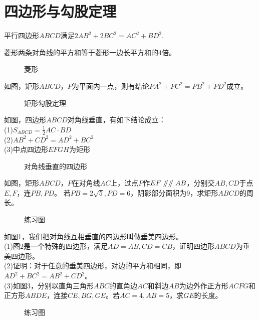 \section{四边形与勾股定理}
\begin{theorem}
    平行四边形$ABCD$满足$2AB^2+2BC^2=AC^2+BD^2$.
\end{theorem}
\begin{corollary}
    菱形两条对角线的平方和等于菱形一边长平方和的4倍。
\end{corollary}
\begin{figure}[H]
    \centering
    \resizebox{4cm}{!}{}
    \caption{菱形}
\end{figure}
\begin{definition}
    如图，矩形$ABCD$，$P$为平面内一点，则有结论$PA^2+PC^2=PB^2+PD^2$成立。
\end{definition}
\begin{figure}[H]
    \centering
    \resizebox{8cm}{!}{}
    \caption{矩形勾股定理}
\end{figure}
\begin{definition}
    如图，四边形$ABCD$对角线垂直，有如下结论成立： \\
    (1)$S_{ABCD}=\frac{1}{2}AC·BD$ \\
    (2)$AB^2+CD^2=AD^2+BC^2$ \\
    (3)中点四边形$EFGH$为矩形
\end{definition}
\begin{figure}[H]
    \centering
    \resizebox{4cm}{!}{}
    \caption{对角线垂直的四边形}
\end{figure}
\begin{problem}
如图，矩形$ABCD$，$P$在对角线$AC$上，过点$P$作$EF\mathrel{/\mkern-5mu/}\mathrel{/\mkern-5mu/} AB$，分别交$AB,CD$于点$E,F$，连$PB,PD$。
若$PB=2\sqrt5,PD=6$，阴影部分面积为9，求矩形$ABCD$的周长。
\end{problem}
\begin{figure}[H]
    \centering
    \resizebox{4cm}{!}{}
    \caption{练习图}
\end{figure}
\begin{problem}
如图1，我们把对角线互相垂直的四边形叫做垂美四边形。 \\
(1)图2是一个特殊的四边形，满足$AD=AB,CD=CB$，证明四边形$ABCD$为垂美四边形。\\
(2)证明：对于任意的垂美四边形，对边的平方和相同，即$AD^2+BC^2=AB^2+CD^2$。 \\
(3)如图3，分别以直角三角形$ABC$的直角边$AC$和斜边$AB$为边外作正方形$ACFG$和正方形$ABDE$，连接$CE,BG,GE$。若$AC=4,AB=5$，求$GE$的长度。
\end{problem}
\begin{figure}[H]
    \centering
    \resizebox{6cm}{!}{}
    \caption{练习图}
\end{figure}
\clearpage
